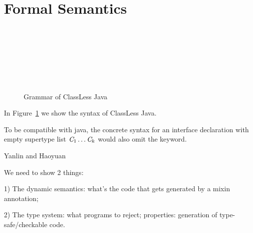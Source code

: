 \section{Formal Semantics}\label{sec:typesafety}

\begin{figure}[h]
\begin{grammar}
\\
\\
\\
\\
\\
\\
\end{grammar}
\caption{Grammar of ClassLess Java}
\label{Grammar}
\end{figure}

In Figure~\ref{Grammar} we show the syntax of ClassLess Java.

To be compatible with java, the concrete syntax for an interface declaration with empty supertype list $\textit{C}_1\ldots\textit{C}_k$ would also omit the \Q@extends@ keyword.

Yanlin and Haoyuan

We need to show 2 things:

1) The dynamic semantics: what's the code that gets generated by a mixin annotation;

2) The type system: what programs to reject; properties: generation of type-safe/checkable code.


